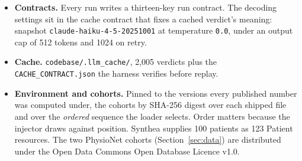 \begin{itemize}[leftmargin=1.4em, itemsep=0.15em]
  \item \textbf{Contracts.} Every run writes a thirteen-key run contract. The decoding settings sit
        in the cache contract that fixes a cached verdict's meaning: snapshot
        \texttt{claude-haiku-4-5-20251001} at temperature \texttt{0.0}, under an output cap of 512
        tokens and 1024 on retry.
  \item \textbf{Cache.} \texttt{codebase/.llm\_cache/}, 2{,}005 verdicts plus the
        \texttt{CACHE\_CONTRACT.json} the harness verifies before replay.
  \item \textbf{Environment and cohorts.} Pinned to the versions every published number was computed
        under, the cohorts by SHA-256 digest over each shipped file and over the \emph{ordered}
        sequence the loader selects. Order matters because the injector draws against position.
        Synthea supplies 100 patients as 123 Patient resources. The two PhysioNet cohorts
        (Section~\ref{sec:data}) are distributed under the Open Data Commons Open Database Licence
        v1.0.
\end{itemize}
